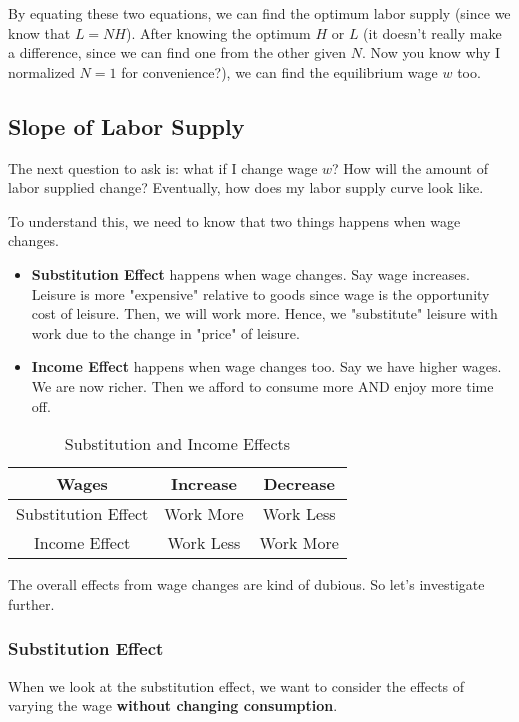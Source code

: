 \documentclass[11pt]{scrartcl}
\begin{document}
By equating these two equations, we can find the optimum labor supply (since we know that $L = NH$). After knowing the optimum $H$ or $L$ (it doesn't really make a difference, since we can find one from the other given $N$. Now you know why I normalized $N=1$ for convenience?), we can find the equilibrium wage $w$ too.

\subsection{Slope of Labor Supply}
The next question to ask is: what if I change wage $w$? How will the amount of labor supplied change? Eventually, how does my labor supply curve look like.

To understand this, we need to know that two things happens when wage changes.

\begin{itemize}
	\item \textbf{Substitution Effect} happens when wage changes. Say wage increases. Leisure is more "expensive" relative to goods since wage is the opportunity cost of leisure. Then, we will work more. Hence, we "substitute" leisure with work due to the change in "price" of leisure.
	\item \textbf{Income Effect} happens when wage changes too. Say we have higher wages. We are now richer. Then we afford to consume more AND enjoy more time off. 
\end{itemize}

\begin{table}[ht!]
\begin{longtable}{c|cc}
\hline
Wages & Increase & Decrease \\
\hline
Substitution Effect & Work More & Work Less \\
Income Effect & Work Less & Work More \\
\hline
\end{longtable}
\caption{Substitution and Income Effects}
\end{table}

The overall effects from wage changes are kind of dubious. So let's investigate further.

\subsubsection{Substitution Effect}
When we look at the substitution effect, we want to consider the effects of varying the wage \textbf{without changing consumption}. 
\end{document}
